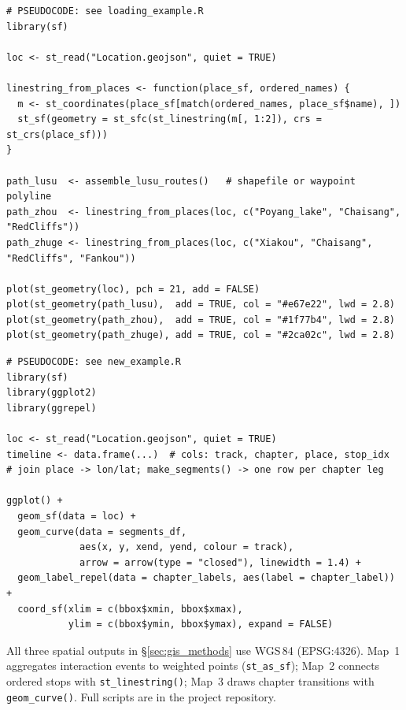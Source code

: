 \documentclass[12pt, a4paper]{article}
\begin{document}
\begin{lstlisting}[caption={Map 2: route reconstruction (\texttt{sf})},
                   label={lst:spatial_routes}]
# PSEUDOCODE: see loading_example.R
library(sf)

loc <- st_read("Location.geojson", quiet = TRUE)

linestring_from_places <- function(place_sf, ordered_names) {
  m <- st_coordinates(place_sf[match(ordered_names, place_sf$name), ])
  st_sf(geometry = st_sfc(st_linestring(m[, 1:2]), crs = st_crs(place_sf)))
}

path_lusu  <- assemble_lusu_routes()   # shapefile or waypoint polyline
path_zhou  <- linestring_from_places(loc, c("Poyang_lake", "Chaisang", "RedCliffs"))
path_zhuge <- linestring_from_places(loc, c("Xiakou", "Chaisang", "RedCliffs", "Fankou"))

plot(st_geometry(loc), pch = 21, add = FALSE)
plot(st_geometry(path_lusu),  add = TRUE, col = "#e67e22", lwd = 2.8)
plot(st_geometry(path_zhou),  add = TRUE, col = "#1f77b4", lwd = 2.8)
plot(st_geometry(path_zhuge), add = TRUE, col = "#2ca02c", lwd = 2.8)
\end{lstlisting}

\begin{lstlisting}[caption={Map 3: timeline route map (\texttt{sf} / \texttt{ggplot2});
                            abbreviated pipeline.},
                   label={lst:spatial_timeline}]
# PSEUDOCODE: see new_example.R
library(sf)
library(ggplot2)
library(ggrepel)

loc <- st_read("Location.geojson", quiet = TRUE)
timeline <- data.frame(...)  # cols: track, chapter, place, stop_idx
# join place -> lon/lat; make_segments() -> one row per chapter leg

ggplot() +
  geom_sf(data = loc) +
  geom_curve(data = segments_df,
             aes(x, y, xend, yend, colour = track),
             arrow = arrow(type = "closed"), linewidth = 1.4) +
  geom_label_repel(data = chapter_labels, aes(label = chapter_label)) +
  coord_sf(xlim = c(bbox$xmin, bbox$xmax),
           ylim = c(bbox$ymin, bbox$ymax), expand = FALSE)
\end{lstlisting}

All three spatial outputs in \S\ref{sec:gis_methods} use WGS\,84 (EPSG:4326).
Map~1 aggregates interaction events to weighted points (\texttt{st\_as\_sf});
Map~2 connects ordered stops with \texttt{st\_linestring()}; Map~3 draws
chapter transitions with \texttt{geom\_curve()}. Full scripts are in the
project repository.
\end{document}
